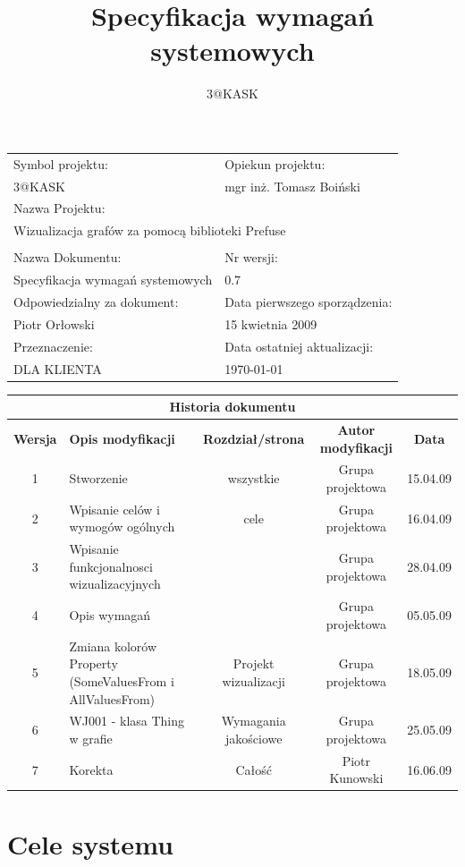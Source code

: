 \documentclass[a4paper,10pt]{article}
\title{Specyfikacja wymagań systemowych}
\author{3@KASK}
\begin{document}



\maketitle

\begin{center}
\begin{tabular}{|p{7cm}|p{7cm}|}
\hline
Symbol projektu: & Opiekun projektu:   \tabularnewline
3@KASK & mgr inż. Tomasz Boiński    \tabularnewline \hline
\multicolumn{2}{|l|}{Nazwa Projektu: } \tabularnewline
\multicolumn{2}{|l|}{Wizualizacja grafów za pomocą biblioteki Prefuse } \tabularnewline
\hline
\multicolumn{2}{l}{ } \tabularnewline %
\hline
Nazwa Dokumentu: & Nr wersji:   \tabularnewline
Specyfikacja wymagań systemowych & 0.7 \tabularnewline \hline
Odpowiedzialny za dokument: & Data pierwszego sporządzenia:   \tabularnewline
Piotr Orłowski & 15 kwietnia 2009 \tabularnewline \hline
Przeznaczenie: & Data ostatniej aktualizacji:   \tabularnewline
DLA KLIENTA & \today \tabularnewline \hline
\end{tabular}
\end{center}


\begin{center}
\begin{tabular}{|c|p{4cm}|c|c|c|}
\multicolumn{5}{c}{\textbf{Historia dokumentu}} \tabularnewline \hline
\textbf{Wersja} & \textbf{Opis modyfikacji} & \textbf{Rozdział/strona} & \textbf{Autor modyfikacji} & \textbf{Data} \tabularnewline \hline
1 & Stworzenie & wszystkie & Grupa projektowa & 15.04.09 \tabularnewline \hline
2 & Wpisanie celów i wymogów ogólnych  & cele & Grupa projektowa & 16.04.09\tabularnewline \hline
3 & Wpisanie funkcjonalnosci wizualizacyjnych & & Grupa projektowa & 28.04.09\tabularnewline \hline
4 & Opis wymagań & & Grupa projektowa & 05.05.09\tabularnewline \hline
5 & Zmiana kolorów Property (SomeValuesFrom i AllValuesFrom) & Projekt wizualizacji & Grupa projektowa & 18.05.09\tabularnewline \hline
6 & WJ001 - klasa Thing w grafie & Wymagania jakościowe & Grupa projektowa & 25.05.09\tabularnewline \hline
7 & Korekta & Całość & Piotr Kunowski & 16.06.09 \tabularnewline \hline
\end{tabular}
\end{center}

\newpage
\tableofcontents
\newpage

\section{Cele systemu}
\end{document}
